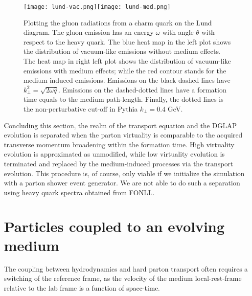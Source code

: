 \begin{figure}
\singlespacing
\texttt{[image: lund-vac.png]}\texttt{[image: lund-med.png]}
\caption[Plotting the gluon radiations from a charm quark on the Lund]{Plotting the gluon radiations from a charm quark on the Lund diagram. The gluon emission has an energy $\omega$ with angle $\theta$ with respect to the heavy quark. The blue heat map in the left plot shows the distribution of vacuum-like emissions without medium effects. The heat map in right left plot shows the distribution of vacuum-like emissions with medium effects; while the red contour stands for the medium induced emissions. Emissions on the black dashed lines have $k_\perp^2 = \sqrt{2\omega \hat{q}}$. Emissions on the dashed-dotted lines have a formation time equals to the medium path-length. Finally, the dotted lines is the non-perturbative cut-off in Pythia $k_\perp = 0.4$ GeV.}
\label{fig:lund}
\end{figure}

Concluding this section, the realm of the transport equation and the DGLAP evolution is separated when the parton virtuality is comparable to the acquired transverse momentum broadening within the formation time.
High virtuality evolution is approximated as unmodified, while low virtuality evolution is terminated and replaced by the medium-induced processes via the transport evolution. 
This procedure is, of course, only viable if we initialize the simulation with a parton shower event generator.
We are not able to do such a separation using heavy quark spectra obtained from FONLL.

\section{Particles coupled to an evolving medium}
\label{section:couple-to-hydro}
The coupling between hydrodynamics and hard parton transport often requires a switching of the reference frame, as the velocity of the medium local-rest-frame relative to the lab frame is a function of space-time.

